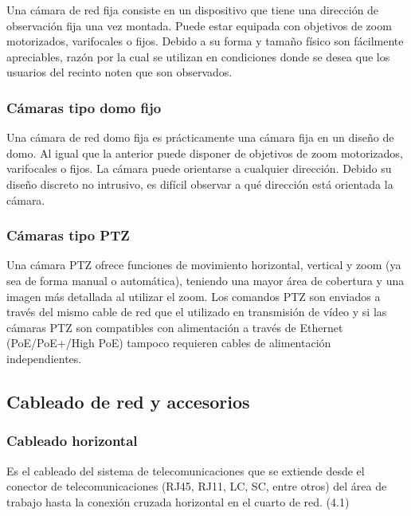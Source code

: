 Una cámara de red fija consiste en un dispositivo que tiene una dirección de observación fija una vez montada. Puede estar equipada con objetivos de zoom motorizados, varifocales o fijos. Debido a su forma y tamaño físico son fácilmente apreciables, razón por la cual se utilizan en condiciones donde se desea que los usuarios del recinto noten que son observados.  \cite{Axis}



\subsubsection{Cámaras tipo domo fijo}

Una cámara de red domo fija es prácticamente una cámara fija en un diseño de domo. Al igual que la anterior puede disponer de objetivos de zoom motorizados, varifocales o fijos. La cámara puede orientarse a cualquier dirección. Debido su diseño discreto no intrusivo, es difícil observar a qué dirección está orientada la cámara. \cite{Axis}


\subsubsection{Cámaras tipo PTZ}

Una cámara PTZ ofrece funciones de movimiento horizontal, vertical y zoom (ya sea de forma manual o automática), teniendo una mayor área de cobertura y una imagen más detallada al utilizar el zoom. Los comandos PTZ son enviados a través del mismo cable de red que el utilizado en transmisión de vídeo y si las cámaras PTZ son compatibles con alimentación a través de Ethernet (PoE/PoE+/High PoE) tampoco requieren cables de alimentación independientes. \cite{Axis}



\subsection{Cableado de red y accesorios}


\subsubsection{Cableado horizontal}

Es el cableado del sistema de telecomunicaciones que se extiende desde el conector de telecomunicaciones (RJ45, RJ11, LC, SC, entre otros) del área de trabajo hasta la conexión cruzada horizontal en el cuarto de red. (4.1) \cite{TIA}


